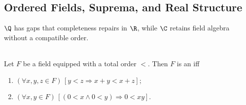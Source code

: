 \subsection{Ordered Fields, Suprema, and Real Structure}

%

$\Q$ has gaps that completeness repairs in $\R$, while $\C$ retains field algebra without a compatible order.

\begin{definition} \label{def:field-and-ordered-field-analysis} \\
Let $F$ be a field equipped with a total order $<$. Then $F$ is an  iff
\begin{enumerate}[label=(\roman*)]
\setlength{\itemsep}{0pt}
\item $(\forall x,y,z\in F)\,[y<z\Rightarrow x+y<x+z]$;
\item $(\forall x,y\in F)\,[(0<x\land0<y)\Rightarrow0<xy]$.
\end{enumerate}
\end{definition}

